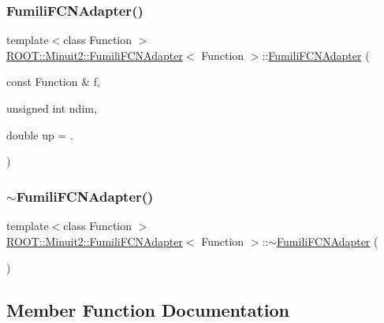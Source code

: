 \subsubsection{\texorpdfstring{FumiliFCNAdapter()}{FumiliFCNAdapter()}\hspace{0.1cm}{\footnotesize\ttfamily [3/3]}}
{\footnotesize\ttfamily template$<$class Function $>$ \\
\mbox{\hyperlink{classROOT_1_1Minuit2_1_1FumiliFCNAdapter}{R\+O\+O\+T\+::\+Minuit2\+::\+Fumili\+F\+C\+N\+Adapter}}$<$ Function $>$\+::\mbox{\hyperlink{classROOT_1_1Minuit2_1_1FumiliFCNAdapter}{Fumili\+F\+C\+N\+Adapter}} (\begin{DoxyParamCaption}\item[{const Function \&}]{f,  }\item[{unsigned int}]{ndim,  }\item[{double}]{up = {.} }\end{DoxyParamCaption})\hspace{0.3cm}{\ttfamily [inline]}}

\mbox{\label{classROOT_1_1Minuit2_1_1FumiliFCNAdapter_ab6c007ce98fb307fc026a52832c39313}} 
\subsubsection{\texorpdfstring{$\sim$FumiliFCNAdapter()}{~FumiliFCNAdapter()}\hspace{0.1cm}{\footnotesize\ttfamily [3/3]}}
{\footnotesize\ttfamily template$<$class Function $>$ \\
\mbox{\hyperlink{classROOT_1_1Minuit2_1_1FumiliFCNAdapter}{R\+O\+O\+T\+::\+Minuit2\+::\+Fumili\+F\+C\+N\+Adapter}}$<$ Function $>$\+::$\sim$\mbox{\hyperlink{classROOT_1_1Minuit2_1_1FumiliFCNAdapter}{Fumili\+F\+C\+N\+Adapter}} (\begin{DoxyParamCaption}{ }\end{DoxyParamCaption})\hspace{0.3cm}{\ttfamily [inline]}}



\subsection{Member Function Documentation}
\mbox{\label{classROOT_1_1Minuit2_1_1FumiliFCNAdapter_a75bacae09c510900a45ea753afae971a}} 
